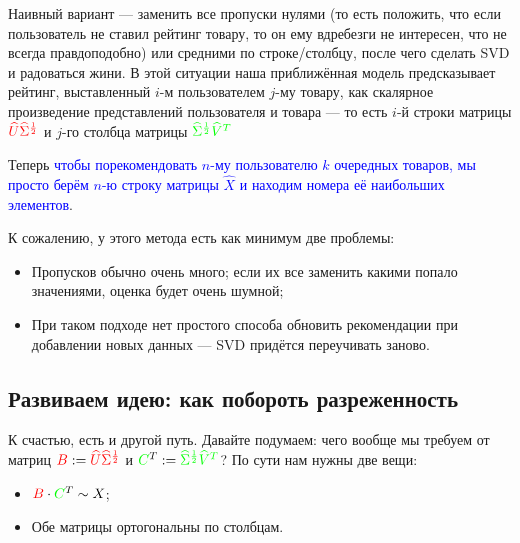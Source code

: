 \documentclass{amsart}
\theoremstyle{definition}
\theoremstyle{remark}
\numberwithin{equation}{section}
\begin{document}
Наивный вариант --- заменить все пропуски нулями (то есть положить, что если пользователь не ставил рейтинг товару, то он ему вдребезги не интересен, что не всегда правдоподобно) или средними по строке/столбцу, после чего сделать SVD и радоваться жини. В этой ситуации наша приближённая модель предсказывает рейтинг, выставленный $i$-м пользователем $j$-му товару, как скалярное произведение представлений пользователя и товара --- то есть $i$-й строки матрицы $\textcolor{red}{\widehat{U}\widehat{\Sigma}^{\frac12}}$ и $j$-го столбца матрицы $\textcolor{green}{\widehat{\Sigma}^{\frac12}\widehat{V}^T}$

Теперь \textcolor{blue}{чтобы порекомендовать $n$-му пользователю $k$ очередных товаров, мы просто берём $n$-ю строку матрицы $\widehat{X}$ и находим номера её наибольших элементов}.

К сожалению, у этого метода есть как минимум две проблемы:
\begin{itemize}
\item Пропусков обычно очень много; если их все заменить какими попало значениями, оценка будет очень шумной;
\item При таком подходе нет простого способа обновить рекомендации при добавлении новых данных --- SVD придётся переучивать заново.
\end{itemize}

\subsection{Развиваем идею: как побороть разреженность}

К счастью, есть и другой путь. Давайте подумаем: чего вообще мы требуем от матриц $\textcolor{red}{B} := \textcolor{red}{\widehat{U}\widehat{\Sigma}^{\frac12}}$ и $\textcolor{green}{C}^T := \textcolor{green}{\widehat{\Sigma}^{\frac12}\widehat{V}^T}$? По сути нам нужны две вещи:
\begin{itemize}
\item $\textcolor{red}{B}\cdot\textcolor{green}{C}^T \sim X$;
\item Обе матрицы ортогональны по столбцам.
\end{itemize}
\end{document}

